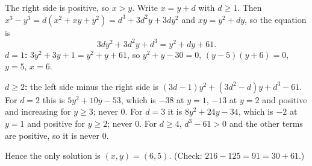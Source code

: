 The right side is positive, so $x>y$. Write $x=y+d$ with $d\ge1$. Then $x^3-y^3=d(x^2+xy+y^2)=d^3+3d^2y+3dy^2$ and $xy=y^2+dy$, so the equation is
\[
3dy^2+3d^2y+d^3=y^2+dy+61 .
\]
\textbf{$d=1$:} $3y^2+3y+1=y^2+y+61$, so $y^2+y-30=0$, $(y-5)(y+6)=0$, $y=5$, $x=6$.

\textbf{$d\ge2$:} the left side minus the right side is $(3d-1)y^2+(3d^2-d)y+d^3-61$.
For $d=2$ this is $5y^2+10y-53$, which is $-38$ at $y=1$, $-13$ at $y=2$ and positive and increasing for $y\ge3$; never $0$. For $d=3$ it is $8y^2+24y-34$, which is $-2$ at $y=1$ and positive for $y\ge2$; never $0$. For $d\ge4$, $d^3-61>0$ and the other terms are positive, so it is never $0$.

Hence the only solution is $\boxed{(x,y)=(6,5)}$. (Check: $216-125=91=30+61$.)

